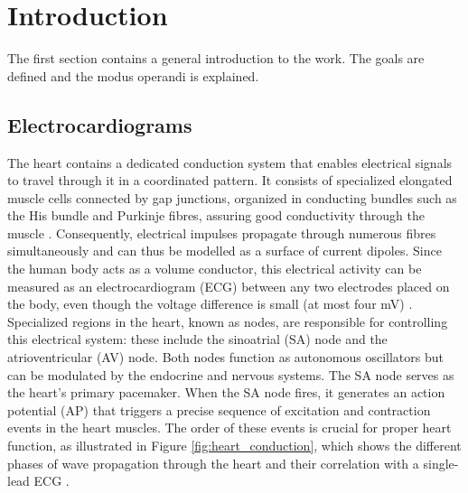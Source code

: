 \chapter{Introduction}
\label{cha:intro}
The first section contains a general introduction to the work. The goals are defined and the modus operandi is explained.

\section{Electrocardiograms}
\label{sec:ECG}

The heart contains a dedicated conduction system that enables electrical signals to travel through it in a coordinated pattern. It consists of specialized elongated muscle cells connected by gap junctions, organized in conducting bundles such as the His bundle and Purkinje fibres, assuring good conductivity through the muscle \cite{villaneloAccessingGapjunctionChannel2017}. Consequently, electrical impulses propagate through numerous fibres simultaneously and can thus be modelled as a surface of current dipoles. Since the human body acts as a volume conductor, this electrical activity can be measured as an electrocardiogram (ECG) between any two electrodes placed on the body, even though the voltage difference is small (at most four mV) \cite{keenerCardiacRhythmicity1998,openstaxCardiovascularSystemHeart2022}.
\\
Specialized regions in the heart, known as nodes, are responsible for controlling this electrical system: these include the sinoatrial (SA) node and the atrioventricular (AV) node. Both nodes function as autonomous oscillators but can be modulated by the endocrine and nervous systems. The SA node serves as the heart's primary pacemaker. When the SA node fires, it generates an action potential (AP) that triggers a precise sequence of excitation and contraction events in the heart muscles. The order of these events is crucial for proper heart function, as illustrated in Figure \ref{fig:heart_conduction}, which shows the different phases of wave propagation through the heart and their correlation with a single-lead ECG \cite{keenerCardiacRhythmicity1998, openstaxCardiovascularSystemHeart2022}.

